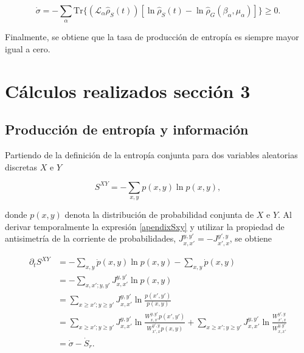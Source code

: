 \begin{appendixs}
\begin{equation*}
    \dot{\sigma} = - \sum_{\alpha} \text{Tr}\{(\mathcal{L}_{\alpha}\hat{\rho}_{S}(t)) [\ln \hat{\rho}_{S}(t) -\ln \hat{\rho}_{G}(\beta_{\alpha},\mu_{\alpha}) ] \} \geq 0.
\end{equation*}

Finalmente, se obtiene que la tasa de producción de entropía es siempre mayor igual a cero.

\label{apendix:thermolaws}

\newpage 

    \section{Cálculos realizados sección 3}
    \subsection{Producción de entropía y información}
    Partiendo de la definición de la entropía conjunta para dos variables aleatorias discretas \( X \) e \( Y \)

\begin{equation}
    S^{XY} = - \sum_{x,y} p(x,y) \ln p(x,y),
    \label{apendixSxy}
\end{equation}

donde \( p(x,y) \) denota la distribución de probabilidad conjunta de \( X \) e \( Y \). Al derivar temporalmente la expresión \ref{apendixSxy} y utilizar la propiedad de antisimetría de la corriente de probabilidades, \( J_{x,x'}^{y,y'} = - J_{x',x}^{y',y} \), se obtiene


    \begin{align*}
        \partial_{t}S^{XY} & = - \sum_{x,y} \dot{p}(x,y) \ln p(x,y) - \sum_{x,y} \dot{p}(x,y) \\
                           & = - \sum_{x,x';y,y'} J_{x,x'}^{y,y'} \ln p(x,y)  \\
                           & = \sum_{x \geq x'; y\geq y'} J_{x,x'}^{y,y'} \ln \frac{p(x',y')}{p(x,y)} \\
                           & = \sum_{x \geq x'; y\geq y'} J_{x,x'}^{y,y'} \ln \frac{W_{x,x'}^{y,y'} p(x',y')}{W_{x',x}^{y',y} p(x,y)} +  \sum_{x \geq x'; y\geq y'} J_{x,x'}^{y,y'} \ln \frac{W_{x',x}^{y',y} }{W_{x,x'}^{y,y'} } \\
                           & = \dot{\sigma} - \dot{S}_{r}.
    \end{align*}


\end{appendixs}
